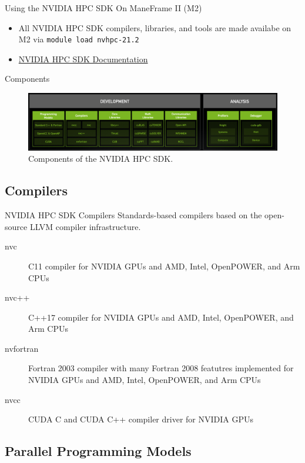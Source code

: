 \documentclass[aspectratio=169]{beamer}
\begin{document}
\begin{frame}{Using the NVIDIA HPC SDK On ManeFrame II (M2)}
\begin{itemize}
  \item All NVIDIA HPC SDK compilers, libraries, and tools are made availabe on M2 via \texttt{module load nvhpc-21.2}
  \item \href{https://docs.nvidia.com/hpc-sdk/index.html}{NVIDIA HPC SDK Documentation}
\end{itemize}
\end{frame}

\begin{frame}{Components}
\begin{figure}
  \includegraphics[width=\linewidth]{figures/nvhpc_components.png}
  \caption{Components of the NVIDIA HPC SDK.}
\end{figure}
\end{frame}

\subsection{Compilers}

\begin{frame}{NVIDIA HPC SDK Compilers}
Standards-based compilers based on the open-source LLVM compiler infrastructure.
\begin{description}
  \item[nvc] C11 compiler for NVIDIA GPUs and AMD, Intel, OpenPOWER, and Arm CPUs
  \item[nvc++] C++17 compiler for NVIDIA GPUs and AMD, Intel, OpenPOWER, and Arm CPUs
  \item[nvfortran] Fortran 2003 compiler with many Fortran 2008 featutres implemented for NVIDIA GPUs and AMD, Intel, OpenPOWER, and Arm CPUs
  \item[nvcc] CUDA C and CUDA C++ compiler driver for NVIDIA GPUs
\end{description}
\end{frame}

\subsection{Parallel Programming Models}
\end{document}
